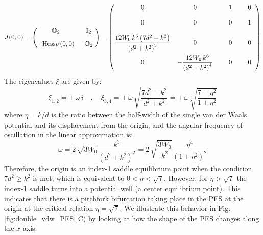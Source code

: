 \documentclass[10pt,aps,onecolumn,superscriptaddress]{revtex4-2}
\begin{document}
\begin{equation}
J(0,0) = \begin{pmatrix}
\mathbb{O}_2 & \hspace{.2cm} \mathbb{I}_2 \hspace{.1cm} \\[.3cm]
-\text{Hess}_{V}(0,0) & \hspace{.2cm} \mathbb{O}_2 \hspace{.1cm}
\end{pmatrix} = \begin{pmatrix}
0 & 0 & \hspace{.5cm} 1 & \hspace{.5cm} 0 \hspace{.2cm} \\[.4cm]
0 & 0 & \hspace{.5cm} 0 & \hspace{.5cm} 1 \hspace{.2cm} \\[.4cm]
\dfrac{12 W_0 \, k^6 \left(7 d^2 - k^2\right)}{\left(d^2 + k^2\right)^5} & 0 & \hspace{.5cm} 0 & \hspace{.5cm} 0 \hspace{.2cm} \\[.4cm]
0 & -\dfrac{12 W_0 \, k^6}{\left(d^2 + k^2\right)^4} & \hspace{.5cm} 0 & \hspace{.5cm} 0 \hspace{.2cm} 
\end{pmatrix}
\end{equation}
The eigenvalues $\xi$ are given by:
\begin{equation}
\xi_{1,2} = \pm \, \omega \, i \quad,\quad \xi_{3,4} = \pm \, \omega \, \sqrt{\dfrac{7 d^2 - k^2}{ d^2 + k^2}} = \pm \, \omega \, \sqrt{\dfrac{7 -  \eta^2}{1 + \eta^2}}
 \end{equation}
where $\eta = k / d$ is the ratio between the half-width of the single van der Waals potential and its displacement from the origin, and the angular frequency of oscillation in the linear approximation is:
\begin{equation}
\omega = 2 \, \sqrt{3 W_0}\dfrac{k^3}{\left(d^2 + k^2\right)^2} = 2 \, \sqrt{\dfrac{3 W_0}{k^2}} \dfrac{\eta^4}{\left(1 + \eta^2\right)^2}
\end{equation}
Therefore, the origin is an index-1 saddle equilibrium point when the condition $7 d^2 \geq k^2$ is met, which is equivalent to $0 < \eta < \sqrt{7}$. However, for $\eta > \sqrt{7}$ the index-1 saddle turns into a potential well (a center equilibrium point). This indicates that there is a pitchfork bifurcation taking place in the PES at the origin at the critical relation $\eta = \sqrt{7}$. We illustrate this behavior in Fig. \ref{fig:double_vdw_PES} C) by looking at how the shape of the PES changes along the $x$-axis.
\end{document}
